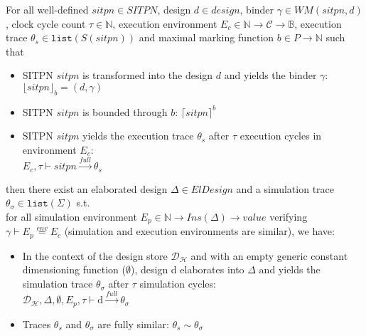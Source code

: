 \documentclass[dvipsnames,12pt]{article}
\begin{document}
\begin{thm}
  \label{thm:beh-pres}
  For all well-defined $sitpn\in{}SITPN$, \hvhdl{} design
  $d\in{}design$, binder $\gamma\in{}WM(sitpn,d)$, clock cycle count
  $\tau\in\mathbb{N}$, execution environment
  $E_c\in{}\mathbb{N}\rightarrow{}\mathcal{C}\rightarrow{}\mathbb{B}$,
  execution trace $\theta_s\in\mathtt{list}(S(sitpn))$ and maximal
  marking function $b\in{}P\rightarrow\mathbb{N}$ such that
  \begin{itemize}
  \item SITPN $sitpn$ is transformed into the \hvhdl{} design $d$ and
    yields the binder $\gamma$: $\lfloor{}sitpn\rfloor_b=(d,\gamma)$
  \item SITPN $sitpn$ is bounded through $b$: $\lceil{}sitpn\rceil^b$
  \item SITPN $sitpn$ yields the execution trace $\theta_s$ after
    $\tau$ execution cycles in environment $E_c$:\\
    $E_c,\tau\vdash{}sitpn\xrightarrow{full}\theta_s$
  \end{itemize}
  
  \noindent{}then there exist an elaborated design
  $\Delta\in{}ElDesign$ and a simulation trace
  $\theta_\sigma\in\mathtt{list}(\Sigma)$ s.t.\\
  for all simulation environment
  $E_p\in{}\mathbb{N}\rightarrow{}Ins(\Delta)\rightarrow{}value$
  verifying $\gamma\vdash{}E_p\stackrel{env}{=}E_c$ (simulation and
  execution environments are similar), we have:
  \begin{itemize}
  \item In the context of the \hilecop{} design store
    $\mathcal{D}_\mathcal{H}$ and with an empty generic constant
    dimensioning function ($\emptyset$), design d elaborates into
    $\Delta$ and yields the simulation trace $\theta_\sigma$ after
    $\tau$
    simulation cycles:\\
    $\mathcal{D}_\mathcal{H},\Delta,\emptyset,E_p,\tau\vdash{}\mathrm{d}\xrightarrow{full}\theta_\sigma$
  \item Traces $\theta_s$ and $\theta_\sigma$ are fully similar:
    $\theta_s\sim\theta_\sigma$
  \end{itemize}
\end{thm}
\end{document}
